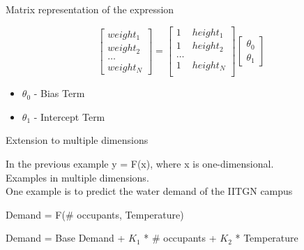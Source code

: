 \documentclass{beamer}
\begin{document}
\begin{frame}{Matrix representation of the expression}



\[\begin{bmatrix}
    weight_{1}   \\
    weight_{2}   \\
    \dots \\
    weight_{N}
\end{bmatrix}
= \begin{bmatrix}
    1& height_{1}   \\
    1& height_{2}   \\
    \dots \\
    1& height_{N}   \\
\end{bmatrix}
\begin{bmatrix}
    \theta_{0} \\
    \theta_{1}
\end{bmatrix}\]


\begin{itemize}
    \item $\theta_{0}$ - Bias Term
    \item $\theta_{1}$ - Intercept Term
\end{itemize}
\end{frame}


\begin{frame}{Extension to multiple dimensions}

In the previous example y = F(x), where x is one-dimensional.\\
Examples in multiple dimensions.\\
One example is to predict the water demand of the IITGN campus

\small{
\begin{center}
    \begin{tcolorbox}
        Demand = F(\# occupants, Temperature)
    \end{tcolorbox}
\end{center}

\begin{center}
    \begin{tcolorbox}
        Demand = Base Demand + $K_{1}$ * \# occupants + $K_{2}$ * Temperature
    \end{tcolorbox}
\end{center}
}

\end{frame}
\end{document}

